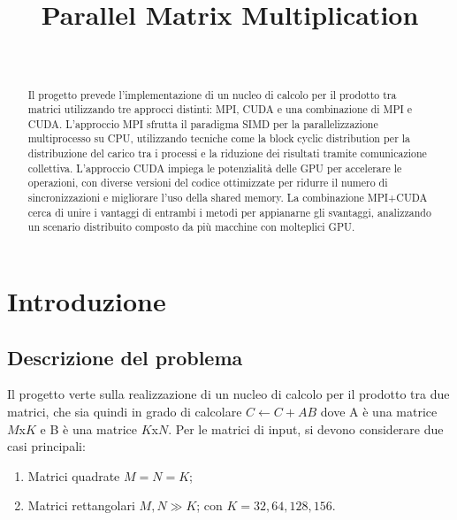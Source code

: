 \documentclass[conference]{IEEEtran}
\begin{document}
\title{Parallel Matrix Multiplication\\
}

\author{
\and
{}
\\
}

\thispagestyle{plain}
\pagestyle{plain}

\maketitle

\begin{abstract}
Il progetto prevede l'implementazione di un nucleo di calcolo per il prodotto tra matrici utilizzando tre approcci distinti: MPI, CUDA e una combinazione di MPI e CUDA. L'approccio MPI sfrutta il paradigma SIMD per la parallelizzazione multiprocesso su CPU, utilizzando tecniche come la block cyclic distribution per la distribuzione del carico tra i processi e la riduzione dei risultati tramite comunicazione collettiva. L'approccio CUDA impiega le potenzialità delle GPU per accelerare le operazioni, con diverse versioni del codice ottimizzate per ridurre il numero di sincronizzazioni e migliorare l'uso della shared memory. La combinazione MPI+CUDA cerca di unire i vantaggi di entrambi i metodi per appianarne gli svantaggi, analizzando un scenario distribuito composto da più macchine con molteplici GPU.
\end{abstract}

\section{Introduzione}
\subsection{Descrizione del problema}
Il progetto verte sulla realizzazione di un nucleo di calcolo per il prodotto tra due matrici, che sia quindi in grado di calcolare
$C \leftarrow C + AB$
dove A è una matrice $M$x$K$ e B è una matrice $K$x$N$. Per le matrici di input, si devono considerare due casi principali:
\begin{enumerate}
    \item Matrici quadrate $M = N = K$;
    \item Matrici rettangolari $M, N \gg K$; con $K = 32, 64, 128, 156$.
\end{enumerate}
\end{document}
